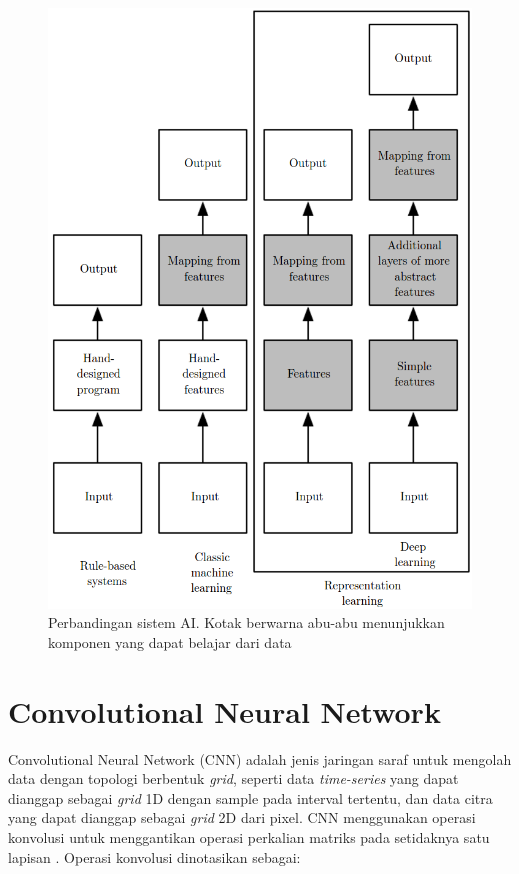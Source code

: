\begin{figure}
    \centering
    \includegraphics[width=12cm]{gambar/landasan-teori/perbandingan-ai.png}
    \caption{Perbandingan sistem AI. Kotak berwarna abu-abu menunjukkan komponen yang dapat belajar dari data \Parencite{Goodfellow-2016}}
    \label{gambar:perbandingan-ai}
\end{figure}


%
%
\section{Convolutional Neural Network}
Convolutional Neural Network (CNN) adalah jenis jaringan saraf untuk mengolah data dengan topologi berbentuk \textit{grid}, seperti data \textit{time-series} yang dapat dianggap sebagai \textit{grid} 1D dengan sample pada interval tertentu, dan data citra yang dapat dianggap sebagai \textit{grid} 2D dari pixel. CNN menggunakan operasi konvolusi untuk menggantikan operasi perkalian matriks pada setidaknya satu lapisan \Parencite{Goodfellow-2016}. Operasi konvolusi dinotasikan sebagai:

